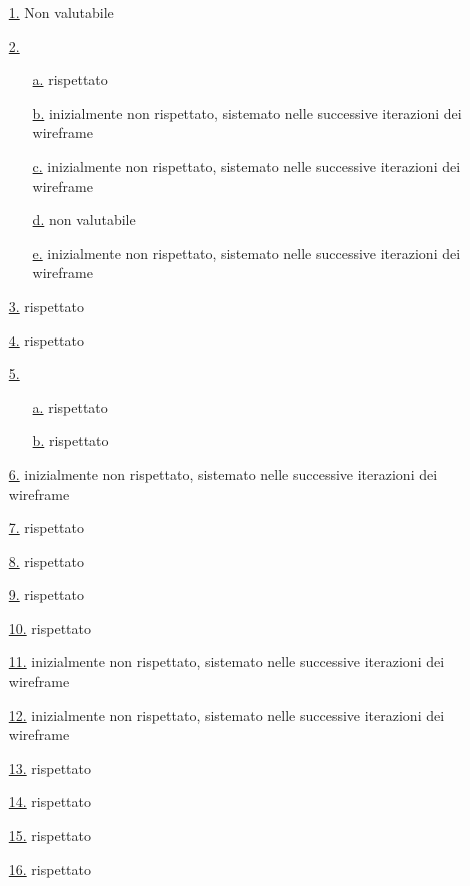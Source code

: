 \begin{itemize}
    \item[{\hyperref[lg:1]{1.}}] Non valutabile
    \item[{\hyperref[lg:2]{2.}}] \begin{itemize}
        \item[{\hyperref[lg:2.a]{a.}}] rispettato
        \item[{\hyperref[lg:2.b]{b.}}] inizialmente non rispettato, sistemato nelle successive iterazioni dei wireframe
        \item[{\hyperref[lg:2.c]{c.}}] inizialmente non rispettato, sistemato nelle successive iterazioni dei wireframe
        \item[{\hyperref[lg:2.d]{d.}}] non valutabile
        \item[{\hyperref[lg:2.e]{e.}}] inizialmente non rispettato, sistemato nelle successive iterazioni dei wireframe
    \end{itemize}
    \item[{\hyperref[lg:3]{3.}}] rispettato
    \item[{\hyperref[lg:4]{4.}}] rispettato
    \item[{\hyperref[lg:5]{5.}}] \begin{itemize}
        \item[{\hyperref[lg:5.a]{a.}}] rispettato
        \item[{\hyperref[lg:5.b]{b.}}] rispettato
    \end{itemize}
    \item[{\hyperref[lg:6]{6.}}] inizialmente non rispettato, sistemato nelle successive iterazioni dei wireframe
    \item[{\hyperref[lg:7]{7.}}] rispettato
    \item[{\hyperref[lg:8]{8.}}] rispettato
    \item[{\hyperref[lg:9]{9.}}] rispettato
    \item[{\hyperref[lg:10]{10.}}] rispettato
    \item[{\hyperref[lg:11]{11.}}] inizialmente non rispettato, sistemato nelle successive iterazioni dei wireframe
    \item[{\hyperref[lg:12]{12.}}] inizialmente non rispettato, sistemato nelle successive iterazioni dei wireframe
    \item[{\hyperref[lg:13]{13.}}] rispettato
    \item[{\hyperref[lg:14]{14.}}] rispettato
    \item[{\hyperref[lg:15]{15.}}] rispettato
    \item[{\hyperref[lg:16]{16.}}] rispettato

\end{itemize}
